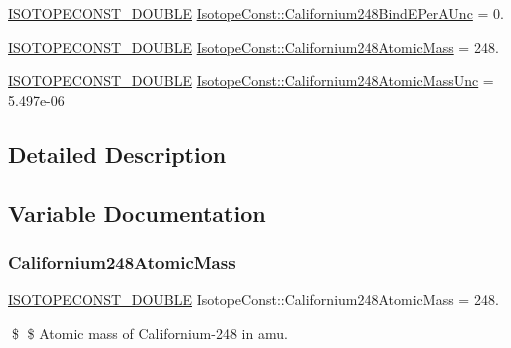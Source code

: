 \begin{DoxyCompactItemize}
\item 
\mbox{\hyperlink{group___isotope_const-_macros_ga8f45a7272ce02c0b4c65c44636ed719a}{I\+S\+O\+T\+O\+P\+E\+C\+O\+N\+S\+T\+\_\+\+D\+O\+U\+B\+LE}} \mbox{\hyperlink{group___isotope_const-_californium-_cf248_ga96aa984c64c61ab16b8028cf50a89f57}{Isotope\+Const\+::\+Californium248\+Bind\+E\+Per\+A\+Unc}} = 0.
\item 
\mbox{\hyperlink{group___isotope_const-_macros_ga8f45a7272ce02c0b4c65c44636ed719a}{I\+S\+O\+T\+O\+P\+E\+C\+O\+N\+S\+T\+\_\+\+D\+O\+U\+B\+LE}} \mbox{\hyperlink{group___isotope_const-_californium-_cf248_gad94f692826d155d975d10bc689c66b85}{Isotope\+Const\+::\+Californium248\+Atomic\+Mass}} = 248.
\item 
\mbox{\hyperlink{group___isotope_const-_macros_ga8f45a7272ce02c0b4c65c44636ed719a}{I\+S\+O\+T\+O\+P\+E\+C\+O\+N\+S\+T\+\_\+\+D\+O\+U\+B\+LE}} \mbox{\hyperlink{group___isotope_const-_californium-_cf248_gaa6c2148f16d8d422f73c9e2f6a9ecf8a}{Isotope\+Const\+::\+Californium248\+Atomic\+Mass\+Unc}} = 5.\+497e-\/06
\end{DoxyCompactItemize}


\subsection{Detailed Description}


\subsection{Variable Documentation}
\mbox{\label{group___isotope_const-_californium-_cf248_gad94f692826d155d975d10bc689c66b85}} 
\subsubsection{\texorpdfstring{Californium248\+Atomic\+Mass}{Californium248AtomicMass}}
{\footnotesize\ttfamily \mbox{\hyperlink{group___isotope_const-_macros_ga8f45a7272ce02c0b4c65c44636ed719a}{I\+S\+O\+T\+O\+P\+E\+C\+O\+N\+S\+T\+\_\+\+D\+O\+U\+B\+LE}} Isotope\+Const\+::\+Californium248\+Atomic\+Mass = 248.}

\$ \$ Atomic mass of Californium-\/248 in amu. \mbox{\label{group___isotope_const-_californium-_cf248_gaa6c2148f16d8d422f73c9e2f6a9ecf8a}} 
